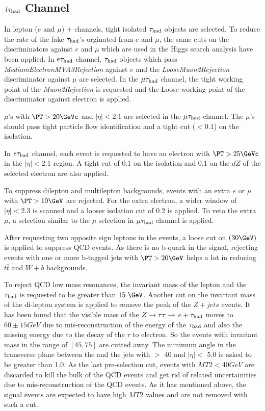 \subsection{\texorpdfstring{$\,l\tau_{\rm had}$ Channel}{lepton-tau Channel}}
\label{sect:leptonTauCuts}
In lepton ($e$ and $\mu$) $+$ \Tau channels, tight isolated $\tau_{\rm had}$ objects are selected. To reduce the rate of the fake $\tau_{\rm had}$'s orginated from $e$ and $\mu$, the same cuts on the discriminators against $e$ and $\mu$ which are used in the Higgs search analysis \cite{CMS_AN_2013-188} have been applied. In $e\tau_{\rm had}$ channel, $\tau_{\rm had}$ objects which pass \emph{MediumElectronMVA3Rejection} against $e$ and the \emph{LooseMuon2Rejection} discriminator against $\mu$ are selected. In the $\mu\tau_{\rm had}$ channel, the tight working point of the \emph{Muon2Rejection} is requested and the Loose working point of the discriminator against electron is applied.

$\mu$'s with $\PT > 20 \GeVc$ and $|\eta|<2.1$ are selected in the $\mu\tau_{\rm had}$ channel. The $\mu$'s should pass tight particle flow identification and a tight cut ($<0.1$) on the isolation.
 
In $e\tau_{\rm had}$ channel, each event is requested to have an electron with $\PT >25 \GeVc$ in the $|\eta| < 2.1 $ region. A tight cut of $0.1$ on the isolation and $0.1$ on the $dZ$ of the selected electron are also applied.

To suppress dilepton and multilepton backgrounds, events with an extra $e$ or $\mu$ with $\PT >10 \GeV$ are rejected. For the extra electron, a wider window of $|\eta|<2.3$ is scanned and a looser isolation cut of $0.2$ is applied. To veto the extra $\mu$, a selection similar to the $\mu$ selection in $\mu\tau_{\rm had}$ channel is applied.

After requesting two opposite sign leptons in the events, a loose cut on \MET $(30 \GeV)$ is applied to suppress QCD events. As there is no b-quark in the signal, rejecting events with one or more b-tagged jets with $\PT > 20 \GeV$ helps a lot in reducing $t\bar{t}$ and $W+b$ backgrounds.

To reject QCD low mass resonances, the invariant mass of the lepton and the $\tau_{\rm had}$ is requested to be greater than $15\ \GeV$. Another cut on the invariant mass of the di-lepton system is applied to remove the peak of the $Z+jets$ events. It has been found that the visible mass of the $Z\to\tau\tau\to\,e +\tau_{\rm had}$ moves to $60 \pm 15 GeV$ due to mis-reconstruction of the energy of the $\tau_{\rm had}$ and also the missing energy due to the decay of the $\tau$ to electron. So the events with invariant mass in the range of $[45,75]$ are cutted away. The minimum angle in the transverse plane between the \MET and the jets with \PT $>$ 40 \GeVc and $|\eta| <$ 5.0 is asked to be greater than 1.0. As the last pre-selection cut, events with $MT2<40 GeV$ are discarded to kill the bulk of the QCD events and get rid of related uncertainities due to mis-reconstruction of the QCD events. As it has mentioned above, the signal events are expected to have high $MT2$ values and are not removed with such a cut.

